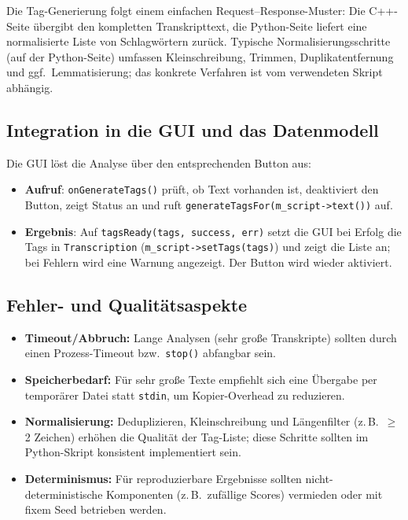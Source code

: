 Die Tag-Generierung folgt einem einfachen Request--Response-Muster: Die C++-Seite übergibt den kompletten Transkripttext, die Python-Seite liefert eine normalisierte Liste von Schlagwörtern zurück. Typische Normalisierungsschritte (auf der Python-Seite) umfassen Kleinschreibung, Trimmen, Duplikatentfernung und ggf.\ Lemmatisierung; das konkrete Verfahren ist vom verwendeten Skript abhängig.


\subsection*{Integration in die GUI und das Datenmodell}

Die GUI löst die Analyse über den entsprechenden Button aus:
\begin{itemize}
    \item \textbf{Aufruf}: \texttt{onGenerateTags()} prüft, ob Text vorhanden ist, deaktiviert den Button, zeigt Status an und ruft \texttt{generateTagsFor(m\_script->text())} auf.
    \item \textbf{Ergebnis}: Auf \texttt{tagsReady(tags, success, err)} setzt die GUI bei Erfolg die Tags in \texttt{Transcription} (\texttt{m\_script->setTags(tags)}) und zeigt die Liste an; bei Fehlern wird eine Warnung angezeigt. Der Button wird wieder aktiviert.
\end{itemize}

\subsection*{Fehler- und Qualitätsaspekte}

\begin{itemize}
    \item \textbf{Timeout/Abbruch:} Lange Analysen (sehr große Transkripte) sollten durch einen Prozess-Timeout bzw.\ \texttt{stop()} abfangbar sein.
    \item \textbf{Speicherbedarf:} Für sehr große Texte empfiehlt sich eine Übergabe per temporärer Datei statt \texttt{stdin}, um Kopier-Overhead zu reduzieren.
    \item \textbf{Normalisierung:} Deduplizieren, Kleinschreibung und Längenfilter (z.\,B.\ \(\geq\) 2 Zeichen) erhöhen die Qualität der Tag-Liste; diese Schritte sollten im Python-Skript konsistent implementiert sein.
    \item \textbf{Determinismus:} Für reproduzierbare Ergebnisse sollten nicht-deterministische Komponenten (z.\,B.\ zufällige Scores) vermieden oder mit fixem Seed betrieben werden.
\end{itemize}
